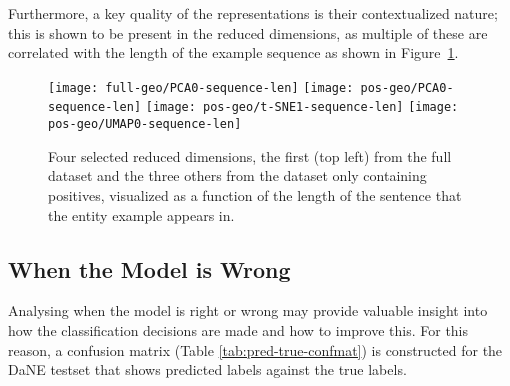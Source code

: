\documentclass[main.tex]{subfiles}
\begin{document}
Furthermore, a key quality of the representations is their contextualized nature; this is shown to be present in the reduced dimensions, as multiple of these are correlated with the length of the example sequence as shown in Figure~\ref{fig:repvslen}.

\begin{figure}[H]
    \centering
        \texttt{[image: full-geo/PCA0-sequence-len]}
        \texttt{[image: pos-geo/PCA0-sequence-len]}
        \texttt{[image: pos-geo/t-SNE1-sequence-len]}
        \texttt{[image: pos-geo/UMAP0-sequence-len]}
     \caption{
        Four selected reduced dimensions, the first (top left) from the full dataset and the three others from the dataset only containing positives, visualized as a function of the length of the sentence that the entity example appears in.
    }
    \label{fig:repvslen}
\end{figure}\noindent

\subsection{When the Model is Wrong}

Analysing when the model is right or wrong may provide valuable insight into how the classification decisions are made and how to improve this.
For this reason, a confusion matrix (Table \ref{tab:pred-true-confmat}) is constructed for the DaNE testset that shows predicted labels against the true labels\footnotemark.

\end{document}

